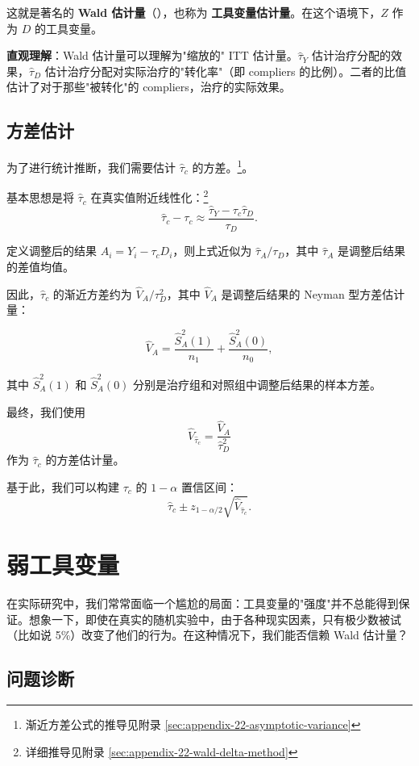这就是著名的 \textbf{Wald 估计量}（\citealp{Wald:1940}），也称为 \textbf{工具变量估计量}。在这个语境下，$Z$ 作为 $D$ 的工具变量。

\textbf{直观理解}：Wald 估计量可以理解为"缩放的" ITT 估计量。$\hat{\tau}_Y$ 估计治疗分配的效果，$\hat{\tau}_D$ 估计治疗分配对实际治疗的"转化率"（即 compliers 的比例）。二者的比值估计了对于那些"被转化"的 compliers，治疗的实际效果。

\subsection{方差估计}\label{sec:22-variance-estimation}

为了进行统计推断，我们需要估计 $\hat{\tau}_c$ 的方差。\footnote{渐近方差公式的推导见附录 \cref{sec:appendix-22-asymptotic-variance}}。

基本思想是将 $\hat{\tau}_c$ 在真实值附近线性化：\footnote{详细推导见附录 \cref{sec:appendix-22-wald-delta-method}}
\[
\hat{\tau}_c - \tau_c \approx \frac{\hat{\tau}_Y - \tau_c \hat{\tau}_D}{\tau_D}.
\]

定义调整后的结果 $A_i = Y_i - \tau_c D_i$，则上式近似为 $\hat{\tau}_A / \tau_D$，其中 $\hat{\tau}_A$ 是调整后结果的差值均值。

因此，$\hat{\tau}_c$ 的渐近方差约为 $\hat{V}_A / \tau_D^2$，其中 $\hat{V}_A$ 是调整后结果的 Neyman 型方差估计量：

\[
\hat{V}_A = \frac{\hat{S}_A^2(1)}{n_1} + \frac{\hat{S}_A^2(0)}{n_0},
\label{eq:22-adjusted-variance}
\]

其中 $\hat{S}_A^2(1)$ 和 $\hat{S}_A^2(0)$ 分别是治疗组和对照组中调整后结果的样本方差。

最终，我们使用
\[
\hat{V}_{\hat{\tau}_c} = \frac{\hat{V}_A}{\hat{\tau}_D^2}
\label{eq:22-cace-variance}
\]
作为 $\hat{\tau}_c$ 的方差估计量。

基于此，我们可以构建 $\tau_c$ 的 $1-\alpha$ 置信区间：
\[
\hat{\tau}_c \pm z_{1-\alpha/2} \sqrt{\hat{V}_{\hat{\tau}_c}}.
\label{eq:22-cace-ci}
\]

\section{弱工具变量}\label{sec:22-weak-iv}

在实际研究中，我们常常面临一个尴尬的局面：工具变量的"强度"并不总能得到保证。想象一下，即使在真实的随机实验中，由于各种现实因素，只有极少数被试（比如说 5\%）改变了他们的行为。在这种情况下，我们能否信赖 Wald 估计量？

\subsection{问题诊断}\label{sec:22-weak-iv-problem}

